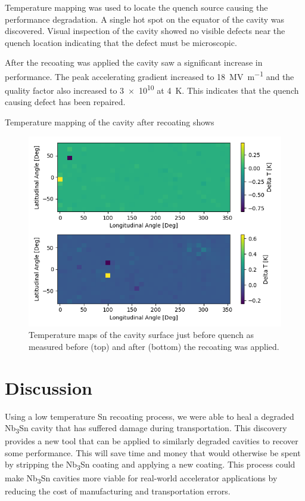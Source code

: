 \documentclass[]{revtex4-2}
\begin{document}
Temperature mapping was used to locate the quench source causing the performance degradation. A single hot spot on the equator of the cavity was discovered. Visual inspection of the cavity showed no visible defects near the quench location indicating that the defect must be microscopic.

After the recoating was applied the cavity saw a significant increase in performance. The peak accelerating gradient increased to \qty{18}{\mega\volt\per\meter} and the quality factor also increased to \num{3e10} at \qty{4}{\kelvin}. This indicates that the quench causing defect has been repaired. 

Temperature mapping of the cavity after recoating shows







\begin{figure}[h!]%
    \centering%
    \includegraphics{./figures/TMAP.png}%
    \caption{Temperature maps of the cavity surface just before quench as measured before (top) and after (bottom) the recoating was applied.}%
    \label{fig:VTS}%
\end{figure}


\section{Discussion}
\label{sec:Discussion}

Using a low temperature Sn recoating process, we were able to heal a degraded Nb\textsubscript{3}Sn cavity that has suffered damage during transportation. This discovery provides a new tool that can be applied to similarly degraded cavities to recover some performance. This will save time and money that would otherwise be spent by stripping the Nb\textsubscript{3}Sn coating and applying a new coating. This process could make Nb\textsubscript{3}Sn cavities more viable for real-world accelerator applications by reducing the cost of manufacturing and transportation errors.





\end{document}
